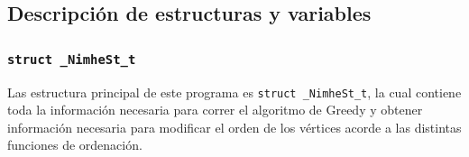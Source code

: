 \documentclass[11pt,a4paper]{article}
\theoremstyle{plain}
\begin{document}
	\subsection{Descripción de estructuras y variables}
	\label{sec:3.1}
	
		\subsubsection{\texttt{struct \_NimheSt\_t}}
	
Las estructura principal de este programa es \texttt{struct \_NimheSt\_t}, la cual contiene toda la información necesaria para correr el algoritmo de Greedy y obtener información necesaria para modificar el orden de los vértices acorde a las distintas funciones de ordenación.\\
\end{document}
